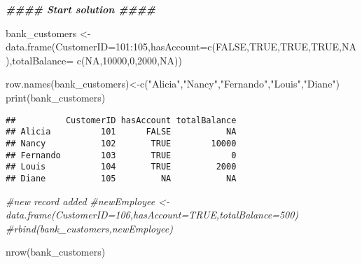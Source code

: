 \documentclass[
]{article}
\newenvironment{Shaded}{\begin{snugshade}}{\end{snugshade}}
\newcommand{\AttributeTok}[1]{\textcolor[rgb]{0.77,0.63,0.00}{#1}}
\newcommand{\CommentTok}[1]{\textcolor[rgb]{0.56,0.35,0.01}{\textit{#1}}}
\newcommand{\ConstantTok}[1]{\textcolor[rgb]{0.00,0.00,0.00}{#1}}
\newcommand{\DecValTok}[1]{\textcolor[rgb]{0.00,0.00,0.81}{#1}}
\newcommand{\DocumentationTok}[1]{\textcolor[rgb]{0.56,0.35,0.01}{\textbf{\textit{#1}}}}
\newcommand{\FunctionTok}[1]{\textcolor[rgb]{0.00,0.00,0.00}{#1}}
\newcommand{\NormalTok}[1]{#1}
\newcommand{\OtherTok}[1]{\textcolor[rgb]{0.56,0.35,0.01}{#1}}
\newcommand{\SpecialCharTok}[1]{\textcolor[rgb]{0.00,0.00,0.00}{#1}}
\newcommand{\StringTok}[1]{\textcolor[rgb]{0.31,0.60,0.02}{#1}}
\begin{document}
\begin{Shaded}
\begin{Highlighting}[]
\DocumentationTok{\#\#\#\# Start solution \#\#\#\#}
\end{Highlighting}
\end{Shaded}

\begin{Shaded}
\begin{Highlighting}[]
\NormalTok{bank\_customers }\OtherTok{\textless{}{-}} \FunctionTok{data.frame}\NormalTok{(}\AttributeTok{CustomerID=}\DecValTok{101}\SpecialCharTok{:}\DecValTok{105}\NormalTok{,}\AttributeTok{hasAccount=}\FunctionTok{c}\NormalTok{(}\ConstantTok{FALSE}\NormalTok{,}\ConstantTok{TRUE}\NormalTok{,}\ConstantTok{TRUE}\NormalTok{,}\ConstantTok{TRUE}\NormalTok{,}\ConstantTok{NA}\NormalTok{),}\AttributeTok{totalBalance=} \FunctionTok{c}\NormalTok{(}\ConstantTok{NA}\NormalTok{,}\DecValTok{10000}\NormalTok{,}\DecValTok{0}\NormalTok{,}\DecValTok{2000}\NormalTok{,}\ConstantTok{NA}\NormalTok{))}

\FunctionTok{row.names}\NormalTok{(bank\_customers)}\OtherTok{\textless{}{-}}\FunctionTok{c}\NormalTok{(}\StringTok{"Alicia"}\NormalTok{,}\StringTok{"Nancy"}\NormalTok{,}\StringTok{"Fernando"}\NormalTok{,}\StringTok{"Louis"}\NormalTok{,}\StringTok{"Diane"}\NormalTok{)}
\FunctionTok{print}\NormalTok{(bank\_customers)}
\end{Highlighting}
\end{Shaded}

\begin{verbatim}
##          CustomerID hasAccount totalBalance
## Alicia          101      FALSE           NA
## Nancy           102       TRUE        10000
## Fernando        103       TRUE            0
## Louis           104       TRUE         2000
## Diane           105         NA           NA
\end{verbatim}

\begin{Shaded}
\begin{Highlighting}[]
\CommentTok{\#new record added}
\CommentTok{\#newEmployee \textless{}{-} data.frame(CustomerID=106,hasAccount=TRUE,totalBalance=500)}
\CommentTok{\#rbind(bank\_customers,newEmployee)}
\end{Highlighting}
\end{Shaded}

\begin{Shaded}
\begin{Highlighting}[]
\FunctionTok{nrow}\NormalTok{(bank\_customers)}
\end{Highlighting}
\end{Shaded}
\end{document}
